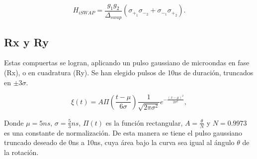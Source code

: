 \begin{equation}
    H_{iSWAP} = \frac{g_1 g_2}{\Delta_{swap}} (\sigma_{+_1} \sigma_{-_2} + \sigma_{-_1} \sigma_{+_2}) .
\end{equation}

\subsection{Rx y Ry}

Estas compuertas se logran, aplicando un pulso gaussiano de microondas en fase (Rx), o en cuadratura (Ry). Se han elegido pulsos de 10ns de duración, truncados en $\pm 3 \sigma$.

\begin{equation}
    \xi(t) = A \Pi\left(\frac{t-\mu}{6\sigma}\right) \frac{1}{\sqrt{2 \pi \sigma^2}} e^{-\frac{(x-\mu)^2}{2 \sigma^2}} ,
\end{equation}

Donde $\mu = 5ns$, $\sigma = \frac{5}{3} ns$, $\Pi(t)$ es la función rectangular, $A = \frac{\theta}{N}$ y $N = 0.9973$ es una constante de normalización. De esta manera se tiene el pulso gaussiano truncado deseado de 0ns a 10ns, cuya área bajo la curva sea igual al ángulo $\theta$ de la rotación.

